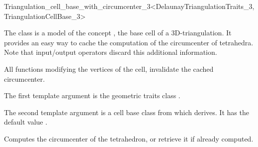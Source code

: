

\begin{ccRefClass}{Triangulation_cell_base_with_circumcenter_3<DelaunayTriangulationTraits_3, TriangulationCellBase_3>}

\ccDefinition

The class  is a model of the
concept , the base cell of a 3D-triangulation.
It provides an easy way to cache the computation of the circumcenter of
tetrahedra.
Note that input/output operators discard this additional information.

All functions modifying the vertices of the cell, invalidate the cached
circumcenter.


\ccParameters

The first template argument is the geometric traits class
.

The second template argument is a cell base class from which
 derives.
It has the default value .

\ccIsModel {}

\ccInheritsFrom {}



\ccAccessFunctions
{}
\ccTagFullDeclarations

{Computes the circumcenter of the tetrahedron, or retrieve it if already
computed.}

\ccSeeAlso

\\

\end{ccRefClass}
